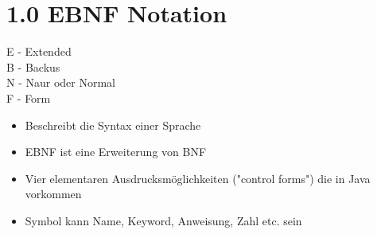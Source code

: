 \documentclass[11pt]{article}
\begin{document}
\section{1.0 EBNF Notation}
\label{sec:org7b75009}
E - Extended\\
B - Backus\\
N - Naur oder Normal\\
F - Form\\

\begin{itemize}
\item Beschreibt die Syntax einer Sprache\\
\item EBNF ist eine Erweiterung von BNF\\

\item Vier elementaren Ausdrucksmöglichkeiten ("control forms") die in Java vorkommen\\
\item Symbol kann Name, Keyword, Anweisung, Zahl etc. sein\\
\end{itemize}
\end{document}
